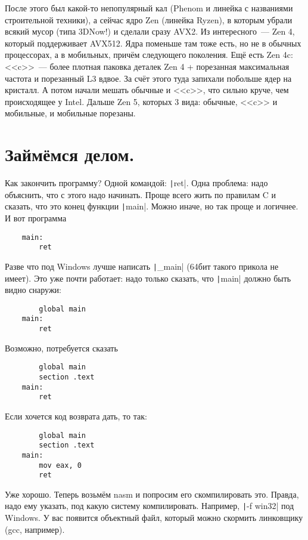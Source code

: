 \documentclass{article}
\begin{document}
    После этого был какой-то непопулярный кал (Phenom и линейка с названиями строительной техники), а сейчас ядро Zen (линейка Ryzen), в которым убрали всякий мусор (типа 3DNow!) и сделали сразу AVX2. Из интересного~--- Zen 4, который поддерживает AVX512. Ядра поменьше там тоже есть, но не в обычных процессорах, а в мобильных, причём следующего поколения. Ещё есть Zen 4c: <<c>>~--- более плотная паковка деталек Zen 4 + порезанная максимальная частота и порезанный L3 вдвое. За счёт этого туда запихали побольше ядер на кристалл. А потом начали мешать обычные и <<c>>, что сильно круче, чем происходящее у Intel. Дальше Zen 5, которых 3 вида: обычные, <<c>> и мобильные, и мобильные порезаны.
    \section{Займёмся делом.}
    Как закончить программу? Одной командой: \texttt|ret|. Одна проблема: надо объяснить, что с этого надо начинать. Проще всего жить по правилам C и сказать, что это конец функции \texttt|main|. Можно иначе, но так проще и логичнее. И вот программа
    \begin{verbatim}
    main:
        ret
    \end{verbatim}
    Разве что под Windows лучше написать \texttt|_main| (64бит такого прикола не имеет). Это уже почти работает: надо только сказать, что \texttt|main| должно быть видно снаружи:
    \begin{verbatim}
        global main
    main:
        ret
    \end{verbatim}
    Возможно, потребуется сказать
    \begin{verbatim}
        global main
        section .text
    main:
        ret
    \end{verbatim}
    Если хочется код возврата дать, то так:
    \begin{verbatim}
        global main
        section .text
    main:
        mov eax, 0
        ret
    \end{verbatim}
    Уже хорошо. Теперь возьмём nasm и попросим его скомпилировать это. Правда, надо ему указать, под какую систему компилировать. Например, \texttt|-f win32| под Windows. У вас появится объектный файл, который можно скормить линковщику (gcc, например).\\
\end{document}
